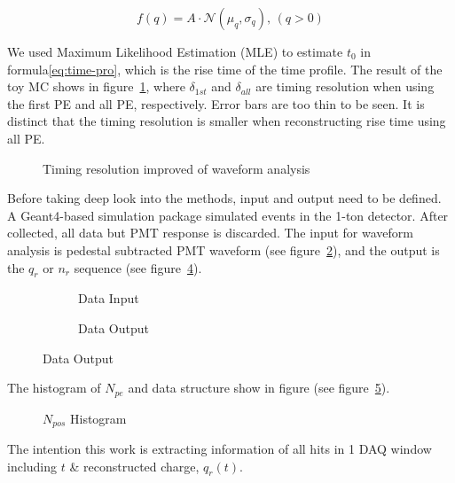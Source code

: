 \begin{equation}
    f(q) = A\cdot\mathcal{N}(\mu_{q},\sigma_{q}),\,(q>0)
    \label{eq:truncated}
\end{equation}

We used Maximum Likelihood Estimation (MLE) to estimate $t_{0}$ in formula\eqref{eq:time-pro}, which is the rise time of the time profile. The result of the toy MC shows in figure~\ref{fig:reso-diff}, where $\delta_{1st}$ and $\delta_{all}$ are timing resolution when using the first PE and all PE, respectively. Error bars are too thin to be seen. It is distinct that the timing resolution is smaller when reconstructing rise time using all PE. 

\begin{figure}[H]
    \centering
    \scalebox{0.7}{}
    \caption{\label{fig:reso-diff} Timing resolution improved of waveform analysis}
\end{figure}

Before taking deep look into the methods, input and output need to be defined. A Geant4\cite{agostinelli_geant4simulation_2003}-based simulation package simulated events in the 1-ton detector\cite{wang_design_2017}. After collected, all data but PMT response is discarded. The input for waveform analysis is pedestal subtracted PMT waveform (see figure~\ref{fig:input}), and the output is the $q_{r}$ or $n_{r}$ sequence (see figure~\ref{fig:output}). 

\begin{figure}[H]
\begin{minipage}[b]{.5\textwidth}
\begin{figure}[H]
    \centering
    \resizebox{\textwidth}{!}{}
    \caption{\label{fig:input} Data Input}
\end{figure}
\end{minipage}
\begin{minipage}[b]{.5\textwidth}
\begin{figure}[H]
    \centering
    \resizebox{\textwidth}{!}{}
    \caption{\label{fig:output} Data Output}
\end{figure}
\end{minipage}
\end{figure}

The histogram of $N_{pe}$ and data structure show in figure (see figure~\ref{fig:penum}). 

\begin{figure}[H]
    \centering
    \scalebox{0.4}{}
    \caption{\label{fig:penum} $N_{pos}$ Histogram}
\end{figure}

The intention this work is extracting information of all hits in 1 DAQ window including $t$ \& reconstructed charge, $q_{r}(t)$. 

